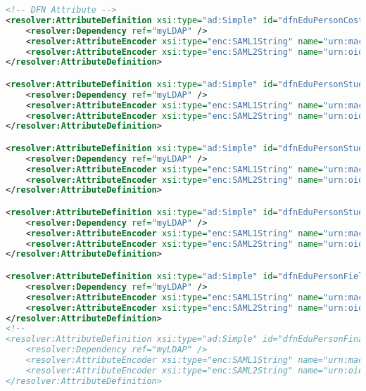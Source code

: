 \begin{lstlisting}[language=xml]
<!-- DFN Attribute -->
<resolver:AttributeDefinition xsi:type="ad:Simple" id="dfnEduPersonCostCenter" sourceAttributeID="dfnEduPersonCostCenter">
	<resolver:Dependency ref="myLDAP" />
	<resolver:AttributeEncoder xsi:type="enc:SAML1String" name="urn:mace:dir:attribute-def:dfnEduPersonCostCenter" />
	<resolver:AttributeEncoder xsi:type="enc:SAML2String" name="urn:oid:1.3.6.1.4.1.22177.400.1.1.3.1" friendlyName="dfnEduPersonCostCenter" />
</resolver:AttributeDefinition>

<resolver:AttributeDefinition xsi:type="ad:Simple" id="dfnEduPersonStudyBranch1" sourceAttributeID="dfnEduPersonStudyBranch1">
	<resolver:Dependency ref="myLDAP" />
	<resolver:AttributeEncoder xsi:type="enc:SAML1String" name="urn:mace:dir:attribute-def:dfnEduPersonStudyBranch1" />
	<resolver:AttributeEncoder xsi:type="enc:SAML2String" name="urn:oid:1.3.6.1.4.1.22177.400.1.1.3.2" friendlyName="dfnEduPersonStudyBranch1" />
</resolver:AttributeDefinition>

<resolver:AttributeDefinition xsi:type="ad:Simple" id="dfnEduPersonStudyBranch2" sourceAttributeID="dfnEduPersonStudyBranch2">
	<resolver:Dependency ref="myLDAP" />
	<resolver:AttributeEncoder xsi:type="enc:SAML1String" name="urn:mace:dir:attribute-def:dfnEduPersonStudyBranch2" />
	<resolver:AttributeEncoder xsi:type="enc:SAML2String" name="urn:oid:1.3.6.1.4.1.22177.400.1.1.3.3" friendlyName="dfnEduPersonStudyBranch2" />
</resolver:AttributeDefinition>

<resolver:AttributeDefinition xsi:type="ad:Simple" id="dfnEduPersonStudyBranch3" sourceAttributeID="dfnEduPersonStudyBranch3">
	<resolver:Dependency ref="myLDAP" />
	<resolver:AttributeEncoder xsi:type="enc:SAML1String" name="urn:mace:dir:attribute-def:dfnEduPersonStudyBranch2" />
	<resolver:AttributeEncoder xsi:type="enc:SAML2String" name="urn:oid:1.3.6.1.4.1.22177.400.1.1.3.4" friendlyName="dfnEduPersonStudyBranch3" />
</resolver:AttributeDefinition>

<resolver:AttributeDefinition xsi:type="ad:Simple" id="dfnEduPersonFieldOfStudyString" sourceAttributeID="dfnEduPersonFieldOfStudyString">
	<resolver:Dependency ref="myLDAP" />
	<resolver:AttributeEncoder xsi:type="enc:SAML1String" name="urn:mace:dir:attribute-def:dfnEduPersonFieldOfStudyString" />
	<resolver:AttributeEncoder xsi:type="enc:SAML2String" name="urn:oid:1.3.6.1.4.1.22177.400.1.1.3.5" friendlyName="dfnEduPersonFieldOfStudyString" />
</resolver:AttributeDefinition>
<!--
<resolver:AttributeDefinition xsi:type="ad:Simple" id="dfnEduPersonFinalDegree" sourceAttributeID="dfnEduPersonFinalDegree">
	<resolver:Dependency ref="myLDAP" />
	<resolver:AttributeEncoder xsi:type="enc:SAML1String" name="urn:mace:dir:attribute-def:dfnEduPersonFinalDegree" />
	<resolver:AttributeEncoder xsi:type="enc:SAML2String" name="urn:oid:1.3.6.1.4.1.22177.400.1.1.3.6" friendlyName="dfnEduPersonFinalDegree" />
</resolver:AttributeDefinition>


\end{lstlisting}
